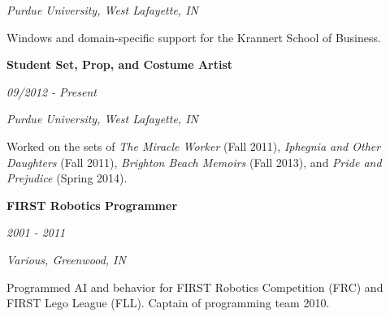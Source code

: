 \documentclass[11pt]{article}
\begin{document}
\begin{center}
\begin{minipage}{0.95\linewidth}
		\textit{Purdue University, West Lafayette, IN}

		Windows and domain-specific support for the Krannert School of Business.
	\end{minipage}

	\vspace{5mm}

	\begin{minipage}{0.95\linewidth}
	\begin{minipage}{0.65\linewidth}
			\begin{flushleft}
				\textbf{Student Set, Prop, and Costume Artist}
			\end{flushleft}
		\end{minipage}
		\hfill
		\begin{minipage}{0.35\linewidth}
			\begin{flushright}
				\textit{09/2012 - Present}
			\end{flushright}
		\end{minipage}

		\textit{Purdue University, West Lafayette, IN}

		Worked on the sets of \textit{The Miracle Worker} (Fall 2011), \textit{Iphegnia and Other Daughters} (Fall 2011), \textit{Brighton Beach Memoirs} (Fall 2013), and \textit{Pride and Prejudice} (Spring 2014).
	\end{minipage}

	\vspace{5mm}
	
	\begin{minipage}{0.95\linewidth}
		\begin{minipage}{0.65\linewidth}
			\begin{flushleft}
				\textbf{FIRST Robotics Programmer}
			\end{flushleft}
		\end{minipage}
		\hfill
		\begin{minipage}{0.35\linewidth}
			\begin{flushright}
				\textit{2001 - 2011}
			\end{flushright}
		\end{minipage}

		\textit{Various, Greenwood, IN}

		Programmed AI and behavior for FIRST Robotics Competition (FRC) and FIRST Lego League (FLL). Captain of programming team 2010.
	\end{minipage}

	\end{center}
\end{document}
